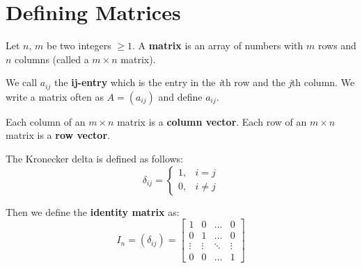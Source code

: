 \documentclass[../main.tex]{subfiles}
\begin{document}

\section{Defining Matrices}

\begin{definition}[Matrix]
    Let \( n,\, m \) be two integers \( \geq 1 \).
    A \textbf{matrix} is an array of numbers with \( m \) rows and \( n \) columns (called a \( m \times n \) matrix).

    We call \textbf{\( a_{ij} \)} the \textbf{ij-entry} which is the entry in the \textit{i}th row and the \textit{j}th column.
    We write a matrix often as \( A=(a_{ij}) \) and define \( a_{ij} \).

    Each column of an \( m \times n \) matrix is a \textbf{column vector}.
    Each row of an \( m \times n \) matrix is a \textbf{row vector}.
\end{definition}

\begin{example}
    The Kronecker delta is defined as follows:
    \[
        \delta_{ij} =
        \begin{cases}
            1,& i = j \\
            0,& i \neq j
        \end{cases}
    \]

    Then we define the \textbf{identity matrix} as:
    \[ I_n = (\delta_{ij}) =
        \begin{bmatrix}
            1 & 0 &  \dots  & 0 \\
            0 & 1 & \dots & 0 \\
            \vdots & \vdots & \ddots & \vdots \\
            0 & 0 & \dots  & 1
        \end{bmatrix}
    \]
\end{example}
\end{document}
